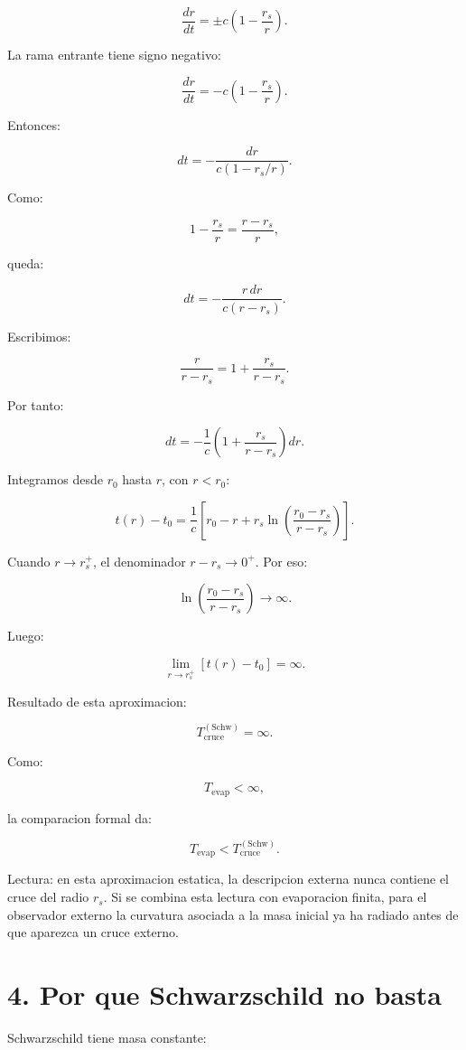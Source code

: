 ﻿\documentclass[11pt,a4paper]{article}
\begin{document}
\[
\frac{dr}{dt}
=
\pm c\left(1-\frac{r_s}{r}\right).
\]

La rama entrante tiene signo negativo:

\[
\frac{dr}{dt}
=
-
c\left(1-\frac{r_s}{r}\right).
\]

Entonces:

\[
dt
=
-
\frac{dr}{c(1-r_s/r)}.
\]

Como:

\[
1-\frac{r_s}{r}
=
\frac{r-r_s}{r},
\]

queda:

\[
dt
=
-
\frac{r\,dr}{c(r-r_s)}.
\]

Escribimos:

\[
\frac{r}{r-r_s}
=
1+\frac{r_s}{r-r_s}.
\]

Por tanto:

\[
dt
=
-
\frac{1}{c}
\left(
1+\frac{r_s}{r-r_s}
\right)dr.
\]

Integramos desde \(r_0\) hasta \(r\), con \(r<r_0\):

\[
t(r)-t_0
=
\frac{1}{c}
\left[
r_0-r
+
r_s\ln\left(\frac{r_0-r_s}{r-r_s}\right)
\right].
\]

Cuando \(r\to r_s^+\), el denominador \(r-r_s\to0^+\). Por eso:

\[
\ln\left(\frac{r_0-r_s}{r-r_s}\right)\to\infty.
\]

Luego:

\[
\lim_{r\to r_s^+}\left[t(r)-t_0\right]=\infty.
\]

Resultado de esta aproximacion:

\[
T_{\mathrm{cruce}}^{(\mathrm{Schw})}=\infty.
\]

Como:

\[
T_{\mathrm{evap}}<\infty,
\]

la comparacion formal da:

\[
T_{\mathrm{evap}}
<
T_{\mathrm{cruce}}^{(\mathrm{Schw})}.
\]

Lectura: en esta aproximacion estatica, la descripcion externa nunca contiene el cruce del radio \(r_s\). Si se combina esta lectura con evaporacion finita, para el observador externo la curvatura asociada a la masa inicial ya ha radiado antes de que aparezca un cruce externo.

\section{4. Por que Schwarzschild no basta}

Schwarzschild tiene masa constante:
\end{document}
